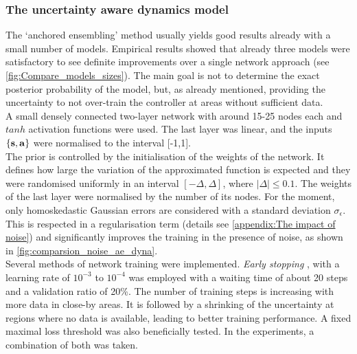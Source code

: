 \documentclass[
reprint,nofootinbib,
amsmath,amssymb,amsfonts,clevref,
aps,
prstab,
]{revtex4-2}
\begin{document}
	\subsubsection{The uncertainty aware dynamics model}\label{ss:The uncertainty aware dynamics model}
	The `anchored ensembling' method usually yields good results already with a small number of models. Empirical results showed that already three models were satisfactory to see definite improvements over a single network approach (see \cref{fig:Compare_models_sizes}). The main goal is not to determine the exact posterior probability of the model, but, as already mentioned, providing the uncertainty to not over-train the controller at areas without sufficient data.\\
	A small densely connected two-layer network with around 15-25 nodes each and $tanh$ activation functions were used. The last layer was linear, and the inputs $\{\mathbf{s},\mathbf{a}\}$ were normalised to the interval [-1,1].\\
	The prior is controlled by the initialisation of the weights of the network. It defines how large the variation of the approximated function is expected and they were randomised uniformly in an interval $[-\Delta, \Delta]$, where $|\Delta|\leq0.1$. The weights of the last layer were normalised by the number of its nodes. For the moment, only homoskedastic Gaussian errors are considered with a standard deviation $\sigma_\epsilon$. This is respected in a regularisation term (details see \cref{appendix:The impact of noise}) and significantly improves the training in the presence of noise, as shown in \cref{fig:comparsion_noise_ae_dyna}. \\
	Several methods of network training were implemented. \emph{Early stopping} \cite{Goodfellow2016}, with a learning rate of $10^{-3}$ to $10^{-4}$  was employed with a waiting time of about 20 steps and a validation ratio of 20\%. The number of training steps is increasing with more data in close-by areas. It is followed by a shrinking of the uncertainty at regions where no data is available, leading to better training performance. A fixed maximal loss threshold was also beneficially tested. In the experiments, a combination of both was taken.
\end{document}
